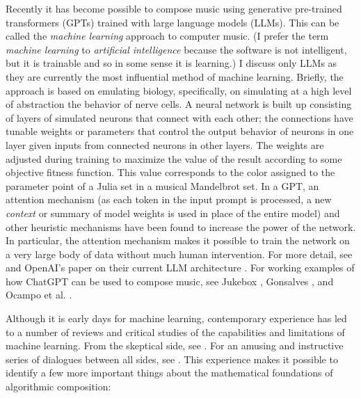 \documentclass[11pt]{scrartcl}
\begin{document}
Recently it has become possible to compose music using generative pre-trained transformers (GPTs) trained with large language models (LLMs). This can be called the \emph{machine learning} approach to computer music. (I prefer the term \emph{machine learning} to \emph{artificial intelligence} because the software is not intelligent, but it is trainable and so in some sense it is learning.) I discuss only LLMs as they are currently the most influential method of machine learning. Briefly, the approach is based on emulating biology, specifically, on simulating at a high level of abstraction the behavior of nerve cells. A neural network is built up consisting of layers of simulated neurons that connect with each other; the connections have tunable weights or parameters that control the output behavior of neurons in one layer given inputs from connected neurons in other layers. The weights are adjusted during training to maximize the value of the result according to some objective fitness function. This value corresponds to the color assigned to the parameter point of a Julia set in a musical Mandelbrot set. In a GPT, an attention mechanism \parencite{vaswani2017attention} (as each token in the input prompt is processed, a new \emph{context} or summary of model weights is used in place of the entire model) and other heuristic mechanisms have been found to increase the power of the network. In particular, the attention mechanism makes it possible to train the network on a very large body of data without much human intervention. For more detail, see \parencite{zhang2023complete} and OpenAI's paper on their current LLM architecture \parencite{openai2023gpt4}. For working examples of how ChatGPT can be used to compose music, see Jukebox \parencite{openai2023jukebox}, Gonsalves \parencite{aitunes}, and Ocampo et al. \parencite{ocampo2023using}.

Although it is early days for machine learning, contemporary experience has led to a number of reviews and critical studies of the capabilities and limitations of machine learning. From the skeptical side, see \parencite{dale2021gpt}. For an amusing and instructive series of dialogues between all sides, see \parencite{shtetl}. This experience makes it possible to identify a few more important things about the mathematical foundations of algorithmic composition:
\end{document}
